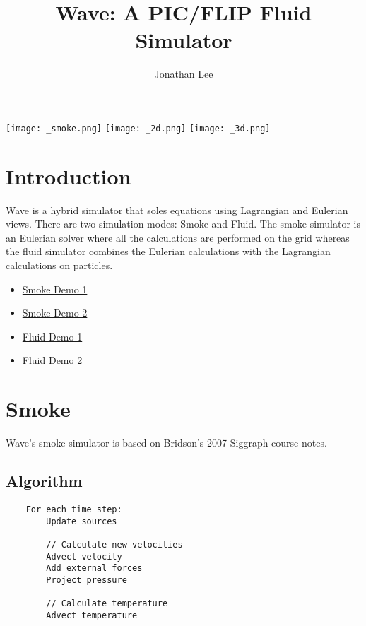 \documentclass[a4paper]{article}
\title{Wave: A PIC/FLIP Fluid Simulator}
\author{Jonathan Lee}
\date{}
\begin{document}
    \maketitle
    
    \begin{figure*}[ht!]
    \texttt{[image: \_smoke.png]}\hfill
    \texttt{[image: \_2d.png]}\hfill
    \texttt{[image: \_3d.png]}
    \end{figure*}
    
    \section{Introduction}
    Wave is a hybrid simulator that soles equations using Lagrangian and Eulerian views. There are two simulation modes: Smoke and Fluid. The smoke simulator is an Eulerian solver where all the calculations are performed on the grid whereas the fluid simulator combines the Eulerian calculations with the Lagrangian calculations on particles. 
    
    \begin{itemize}
    \item{\href{https://youtu.be/yL-t_XStaGg}{Smoke Demo 1}}
    \item{\href{https://youtu.be/JgeTdxtrdic}{Smoke Demo 2}}
    \item{\href{https://youtu.be/dJZmWV0ZABQ}{Fluid Demo 1}}
    \item{\href{https://youtu.be/V1Y69BMAeaE}{Fluid Demo 2}}
    \end{itemize}
    
    \section{Smoke}
    Wave's smoke simulator is based on Bridson's 2007 Siggraph course notes. 
    
    \subsection{Algorithm}
    \begin{lstlisting}
    For each time step:
        Update sources
        
        // Calculate new velocities
        Advect velocity
        Add external forces
        Project pressure
        
        // Calculate temperature
        Advect temperature
    \end{lstlisting}
    
\end{document}

